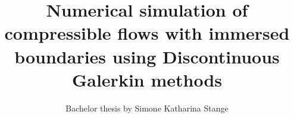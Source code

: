 	\title{Numerical simulation of compressible flows with immersed boundaries using Discontinuous Galerkin methods}
	\subtitle{Bachelor thesis by Simone Katharina Stange}
	\subsubtitle{\today}
	
